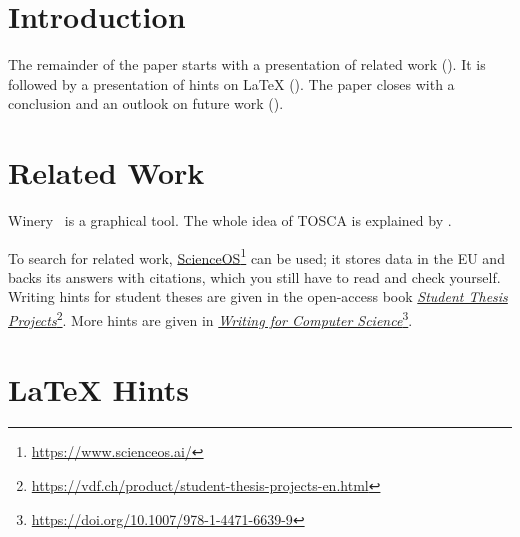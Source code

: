 \maketitle

\begin{abstract}
\lipsum[1]

\end{abstract}


\section{Introduction}
\label{sec:introduction}
\lipsum[1-3]

The remainder of the paper starts with a presentation of related work ().
It is followed by a presentation of hints on \LaTeX{} ().
The paper closes with a conclusion and an outlook on future work ().

\section{Related Work}
\label{sec:relatedwork}

Winery~\citep{Winery} is a graphical  tool.
The whole idea of TOSCA is explained by \citet{Binz2009}.

To search for related work, \href{https://www.scienceos.ai/}{ScienceOS}\footnote{\url{https://www.scienceos.ai/}} can be used; it stores data in the EU and backs its answers with citations, which you still have to read and check yourself.
Writing hints for student theses are given in the open-access book \href{https://vdf.ch/product/student-thesis-projects-en.html}{\emph{Student Thesis Projects}}\footnote{\url{https://vdf.ch/product/student-thesis-projects-en.html}}.
More hints are given in \href{https://doi.org/10.1007/978-1-4471-6639-9}{\emph{Writing for Computer Science}}\footnote{\url{https://doi.org/10.1007/978-1-4471-6639-9}}.

\section{LaTeX Hints}
\label{sec:latexhints}

\newcount\LTGbeginlineexample
\newcount\LTGendlineexample
\newenvironment{ltgexample}%
{\LTGbeginlineexample=\numexpr\inputlineno+1\relax}%
{\LTGendlineexample=\numexpr\inputlineno-1\relax%
  \tcbinputlisting{%
    listing only,
    listing file=\currfilepath,
    colback=green!5!white,
    colframe=green!25,
    coltitle=black!90,
    coltext=black!90,
    left=8mm,
    title=Corresponding \LaTeX{} code of \texttt{\currfilepath},
    minted language=TeX,
    minted style=vs,
    minted options={
        fontsize=\footnotesize,
        firstline=\the\LTGbeginlineexample,
        lastline=\the\LTGendlineexample,
        firstnumber=\the\LTGbeginlineexample,
        breaklines,
        linenos,
        numbersep=8pt
      }
  }
}%

